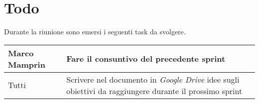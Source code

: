 \section{Todo}
Durante la riunione sono emersi i seguenti task da svolgere.

\begin{center}
  \begin{tabular}{|p{5cm}|p{7cm}|}
    \hline
    Marco Mamprin & Fare il consuntivo del precedente sprint  \\ \hline
    Tutti & Scrivere nel documento in \textit{Google Drive} idee sugli obiettivi da raggiungere durante il prossimo sprint   \\ \hline
  \end{tabular}
\end{center}
